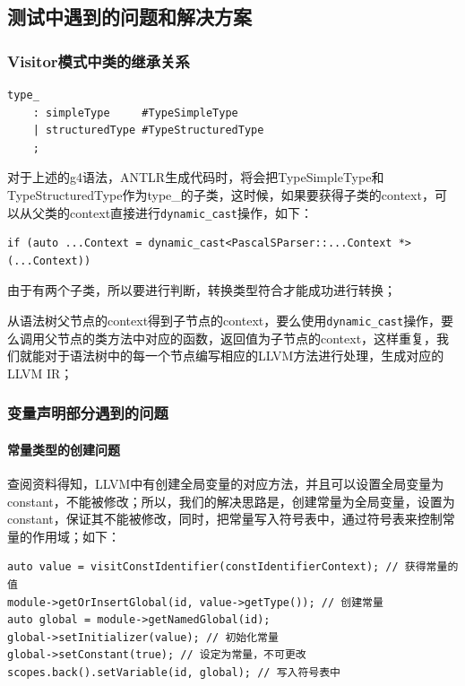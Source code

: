 \documentclass[lang=cn,11pt,a4paper,cite=authornum]{paper}
\begin{document}
\subsection{测试中遇到的问题和解决方案}

\subsubsection{Visitor模式中类的继承关系}

\begin{code}
    \begin{verbatim}
type_
    : simpleType     #TypeSimpleType
    | structuredType #TypeStructuredType
    ;
\end{verbatim}
\end{code}

对于上述的g4语法，ANTLR生成代码时，将会把TypeSimpleType和TypeStructuredType作为type\_的子类，这时候，如果要获得子类的context，可以从父类的context直接进行\texttt{dynamic_cast}操作，如下：

\begin{code}
    \begin{verbatim}
if (auto ...Context = dynamic_cast<PascalSParser::...Context *>(...Context))
\end{verbatim}
\end{code}

由于有两个子类，所以要进行判断，转换类型符合才能成功进行转换；

从语法树父节点的context得到子节点的context，要么使用\texttt{dynamic_cast}操作，要么调用父节点的类方法中对应的函数，返回值为子节点的context，这样重复，我们就能对于语法树中的每一个节点编写相应的LLVM方法进行处理，生成对应的LLVM IR；

\subsubsection{变量声明部分遇到的问题}

\paragraph{常量类型的创建问题}

查阅资料得知，LLVM中有创建全局变量的对应方法，并且可以设置全局变量为constant，不能被修改；所以，我们的解决思路是，创建常量为全局变量，设置为constant，保证其不能被修改，同时，把常量写入符号表中，通过符号表来控制常量的作用域；如下：

\begin{code}
    \begin{verbatim}
auto value = visitConstIdentifier(constIdentifierContext); // 获得常量的值
module->getOrInsertGlobal(id, value->getType()); // 创建常量
auto global = module->getNamedGlobal(id);
global->setInitializer(value); // 初始化常量
global->setConstant(true); // 设定为常量，不可更改
scopes.back().setVariable(id, global); // 写入符号表中
\end{verbatim}
\end{code}
\end{document}
